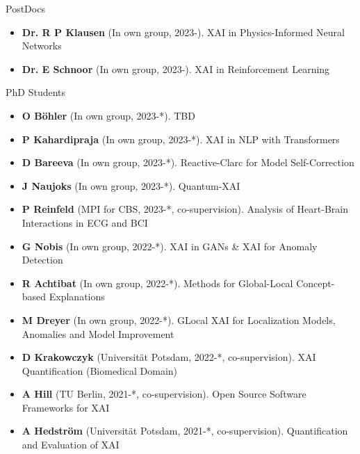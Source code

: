 
\newcommand{\supervision}[3]{\textbf{#1} (In own group, #2). {\small #3}}
\newcommand{\cosupervision}[4]{\textbf{#1} (#2, #3, co-supervision). {\small #4}}

\headedsection 
{PostDocs}
{
    \begin{itemize}
        \item [] \supervision{Dr. R P Klausen}{2023-}{XAI in Physics-Informed Neural Networks}
        \item [] \supervision{Dr. E Schnoor}{2023-}{XAI in Reinforcement Learning}
    \end{itemize}
}


\headedsection 
{PhD Students}
{
    \begin{itemize}
        \item [] \supervision{O Böhler}{2023-*}{TBD}
        \item [] \supervision{P Kahardipraja}{2023-*}{XAI in NLP with Transformers}
        \item [] \supervision{D Bareeva}{2023-*}{Reactive-Clarc for Model Self-Correction}
        \item [] \supervision{J Naujoks}{2023-*}{Quantum-XAI}

        \item [] \cosupervision{P Reinfeld}{MPI for CBS}{2023-*}{Analysis of Heart-Brain Interactions in ECG and BCI}

        \item [] \supervision{G Nobis}{2022-*}{XAI in GANs \& XAI for Anomaly Detection}
        \item [] \supervision{R Achtibat}{2022-*}{Methods for Global-Local Concept-based Explanations}
        \item [] \supervision{M Dreyer}{2022-*}{GLocal XAI for Localization Models, Anomalies and Model Improvement}
        
        \item [] \cosupervision{D Krakowczyk}{Universität Potsdam}{2022-*}{XAI Quantification (Biomedical Domain)}
        \item [] \cosupervision{A Hill}{TU Berlin}{2021-*}{Open Source Software Frameworks for XAI}
        \item [] \cosupervision{A Hedström}{Universität Potsdam}{2021-*}{Quantification and Evaluation of XAI}


\end{itemize}}
